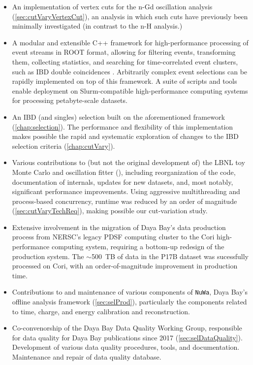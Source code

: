 \documentclass[../thesis.tex]{subfiles}
\begin{document}
\begin{itemize}
\item An implementation of vertex cuts for the n-Gd oscillation analysis (\autoref{sec:cutVaryVertexCut}), an analysis in which such cuts have previously been minimally investigated (in contrast to the n-H analysis.)
\item A modular and extensible C++ framework for high-performance processing of event streams in ROOT format, allowing for filtering events, transforming them, collecting statistics, and searching for time-correlated event clusters, such as IBD double coincidences \cite{SelectorFramework}. Arbitrarily complex event selections can be rapidly implemented on top of this framework. A suite of scripts and tools enable deployment on Slurm-compatible high-performance computing systems for processing petabyte-scale datasets.
\item An IBD (and singles) selection \cite{IbdSel} built on the aforementioned framework (\autoref{chap:selection}). The performance and flexibility of this implementation makes possible the rapid and systematic exploration of changes to the IBD selection criteria (\autoref{chap:cutVary}).
\item Various contributions to (but not the original development of) the LBNL toy Monte Carlo and oscillation fitter (), including reorganization of the code, documentation of internals, updates for new datasets, and, most notably, significant performance improvements. Using aggressive multithreading and process-based concurrency, runtime was reduced by an order of magnitude (\autoref{sec:cutVaryTechReq}), making possible our cut-variation study.
\item Extensive involvement in the migration of Daya Bay's data production process from NERSC's legacy PDSF computing cluster to the Cori high-performance computing system, requiring a bottom-up redesign of the production system. The $\sim$500~TB of data in the P17B dataset was sucessfully processed on Cori, with an order-of-magnitude improvement in production time.
\item Contributions to and maintenance of various components of \texttt{NuWa}, Daya Bay's offline analysis framework (\autoref{sec:selProd}), particularly the components related to time, charge, and energy calibration and reconstruction.
\item Co-convenorship of the Daya Bay Data Quality Working Group, responsible for data quality for Daya Bay publications since 2017 (\autoref{sec:selDataQuality}). Development of various data quality procedures, tools, and documentation. Maintenance and repair of data quality database.

\end{itemize}
\end{document}
